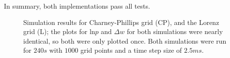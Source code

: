 In summary, both implementations pass all tests.

\begin{figure}[!h]
    \caption{Simulation results for Charney-Phillips grid (CP), and the Lorenz grid (L);
    the plots for $\text{ln}p$ and $\Delta w$ for both simulations were nearly identical, so both were only plotted once.
Both simulations were run for $240s$ with $1000$ grid points and a time step size of $2.5ms$.}
    \label{fig:simulations}
    \small

\end{figure}

